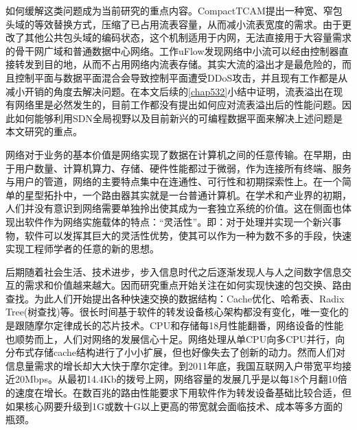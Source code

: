 如何缓解这类问题成为当前研究的重点内容。CompactTCAM提出一种宽、窄包头域的等效替换方式，压缩了已占用流表容量，从而减小流表宽度的需求。由于更改了其他公共包头域的编码状态，这个机制适用于内网，无法直接用于大容量需求的骨干网广域和普通数据中心网络。工作uFlow发现网络中小流可以经由控制器直接转发到目的地，从而不占用网络内流表存储。其实大流的溢出才是最危险的，而且控制平面与数据平面混合会导致控制平面遭受DDoS攻击，并且现有工作都是从减小开销的角度去解决问题。在本文后续的\ref{chap532}小结中证明，流表溢出在现有网络里是必然发生的，目前工作都没有提出如何应对流表溢出后的性能问题。因此如何能够利用SDN全局视野以及目前新兴的可编程数据平面来解决上述问题是本文研究的重点。






\label{chap22}






网络对于业务的基本价值是网络实现了数据在计算机之间的任意传输。在早期，由于用户数量、计算机算力、存储、硬件性能都过于微弱，作为连接所有终端、服务与用户的管道，网络的主要特点集中在连通性、可行性和初期探索性上。在一个简单的星型拓扑中，一个路由器其实就是一台普通计算机。在学术和产业界的初期，人们并没有意识到网络需要单独拎出使其成为一套独立系统的价值。这在侧面也体现出软件作为网络实施载体的特点：“灵活性”。即：对于处理并实现一个新兴事物，软件可以发挥其巨大的灵活性优势，使其可以作为一种为数不多的手段，快速实现工程师学者的任意的新的思想。

后期随着社会生活、技术进步，步入信息时代之后逐渐发现人与人之间数字信息交互的需求和价值越来越大。因而研究重点开始关注在如何实现快速的包交换、路由查找。为此人们开始提出各种快速交换的数据结构：Cache优化、哈希表、Radix Tree(树查找)等。很长时间基于软件的转发设备核心架构都没有变化，唯一变化的是跟随摩尔定律成长的芯片技术。CPU和存储每18月性能翻番，网络设备的性能也顺势而上，人们对网络的发展信心十足。网络处理从单CPU向多CPU并行，向分布式存储cache结构进行了小小扩展，但也好像失去了创新的动力。然而人们对信息量需求的增长却大大快于摩尔定律。到2011年底，我国互联网入户带宽平均接近20Mbps。从最初14.4Kb的拨号上网，网络容量的发展几乎是以每18个月翻10倍的速度在增长。在数百兆的路由性能要求下用软件作为转发设备基础比较合适，但如果核心网要升级到1G或数十G以上更高的带宽就会面临技术、成本等多方面的瓶颈。

